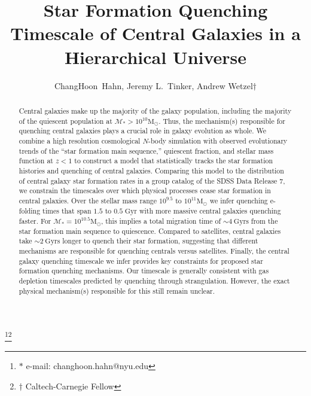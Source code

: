 \documentclass[iop,apj,tighten,twocolappendix,numberedappendix]{emulateapj}
\begin{document}
\title{Star Formation Quenching Timescale of Central Galaxies in a Hierarchical Universe} 

\author{ChangHoon~Hahn, 
Jeremy L.~Tinker, 
Andrew Wetzel$\dagger$}\thanks{$\ast$ e-mail: changhoon.hahn@nyu.edu}\thanks{$\dagger$ Caltech-Carnegie Fellow}
\begin{abstract}
Central galaxies make up the majority of the galaxy population, 
including the majority of the quiescent population at 
$\mathcal{M}_* > 10^{10}\mathrm{M}_\odot$. Thus, the mechanism(s) 
responsible for quenching central galaxies plays a crucial role 
in galaxy evolution as whole.
We combine a high resolution cosmological $N$-body simulation 
with observed evolutionary trends of the ``star formation main sequence,''
quiescent fraction, and stellar mass function at $z < 1$ to 
construct a model that statistically tracks the star formation 
histories and quenching of central galaxies. 
Comparing this model to the distribution of central galaxy 
star formation rates in a group catalog of the SDSS 
Data Release 7, we constrain the timescales over 
which physical processes cease star formation in central galaxies.
Over the stellar mass range $10^{9.5}$ to $10^{11} \mathrm{M}_\odot$ 
we infer quenching e-folding times that span $1.5$ to $0.5\; \mathrm{Gyr}$ 
with more massive central galaxies quenching faster. 
For $\mathcal{M}_* = 10^{10.5}\mathrm{M}_\odot$, this implies a total
migration time of $\sim 4~\mathrm{Gyrs}$ from the star formation main sequence
to quiescence. Compared to satellites, central galaxies take 
$\sim 2~\mathrm{Gyrs}$ longer to quench their star formation, 
suggesting that different mechanisms are responsible for 
quenching centrals versus satellites. Finally, the central galaxy 
quenching timescale we infer provides key constraints for proposed star formation 
quenching mechanisms. Our timescale is generally consistent 
with gas depletion timescales predicted by quenching through 
strangulation. However, the exact physical mechanism(s) 
responsible for this still remain unclear.
\end{abstract}
\end{document}
